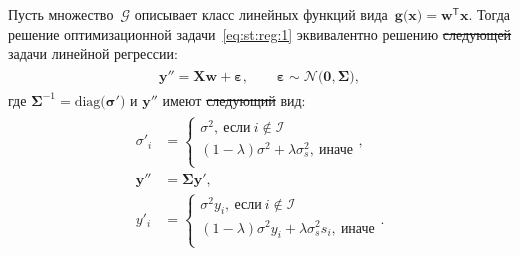 \documentclass[12pt]{a&t}
\providecommand{\DIFdel}[1]{{\protect\color{red}\sout{#1}}}                      %
\providecommand{\DIFaddbegin}{} %
\providecommand{\DIFaddend}{} %
\providecommand{\DIFdelbegin}{} %
\providecommand{\DIFdelend}{} %
\newcommand{\DIFscaledelfig}{0.5}
\newlength{\DIFdelgraphicswidth} %
\newlength{\DIFdelgraphicsheight} %
\newcommand{\DIFaddincludegraphics}[2][]{{\color{blue}\fbox{\DIFOincludegraphics[#1]{#2}}}} %
\newcommand{\DIFdelincludegraphics}[2][]{%
\sbox{\DIFdelgraphicsbox}{\DIFOincludegraphics[#1]{#2}}%
\settoboxwidth{\DIFdelgraphicswidth}{\DIFdelgraphicsbox} %
\settoboxtotalheight{\DIFdelgraphicsheight}{\DIFdelgraphicsbox} %
\scalebox{\DIFscaledelfig}{%
\parbox[b]{\DIFdelgraphicswidth}{\usebox{\DIFdelgraphicsbox}\\[-\baselineskip] \rule{\DIFdelgraphicswidth}{0em}}\llap{\resizebox{\DIFdelgraphicswidth}{\DIFdelgraphicsheight}{%
\setlength{\unitlength}{\DIFdelgraphicswidth}%
\begin{picture}(1,1)%
\thicklines\linethickness{2pt} %
{\color[rgb]{1,0,0}\put(0,0){\framebox(1,1){}}}%
{\color[rgb]{1,0,0}\put(0,0){\line( 1,1){1}}}%
{\color[rgb]{1,0,0}\put(0,1){\line(1,-1){1}}}%
\end{picture}%
}\hspace*{3pt}}} %
} %
\DeclareRobustCommand{\DIFaddbegin}{\DIFOaddbegin \let\includegraphics\DIFaddincludegraphics} %
\DeclareRobustCommand{\DIFaddend}{\DIFOaddend \let\includegraphics\DIFOincludegraphics} %
\DeclareRobustCommand{\DIFdelbegin}{\DIFOdelbegin \let\includegraphics\DIFdelincludegraphics} %
\DeclareRobustCommand{\DIFdelend}{\DIFOaddend \let\includegraphics\DIFOincludegraphics} %
\begin{document}
\begin{theorem}
\label{theorem:st:reg}
Пусть множество~$\mathcal{G}$ описывает класс линейных функций вида~$\mathbf{g}\bigr(\mathbf{x}\bigr) = \mathbf{w}^{\mathsf{T}}\mathbf{x}.$ Тогда решение оптимизационной задачи~\eqref{eq:st:reg:1} эквивалентно решению \DIFdelbegin \DIFdel{следующей }\DIFdelend задачи линейной регрессии:
\begin{gather}
\label{eq:st:reg:th:st:1}
\DIFdelbegin %
\DIFdelend \DIFaddbegin \begin{aligned}
\mathbf{y''} = \mathbf{X}\mathbf{w} + \bm{\varepsilon},\qquad \bm{\varepsilon} \sim \mathcal{N}\bigr(\mathbf{0}, \bm{\Sigma}\bigr),
\end{aligned}\DIFaddend 
\end{gather}
где $\bm{\Sigma}^{-1}=\text{diag}\bigr(\bm{\sigma'}\bigr)$ и $\mathbf{y''}$ имеют \DIFdelbegin \DIFdel{следующий }\DIFdelend вид:
\begin{gather}
\label{eq:st:reg:th:st:2}
\begin{aligned}
\sigma'_{i} &= \begin{cases}
\sigma^2,~\text{если}~i \not \in \mathcal{I}\\
\left(1-\lambda\right)\sigma^2+\lambda\sigma_s^2,~\text{иначе}\\
\end{cases}, \\
\mathbf{y''} &= \bm{\Sigma}\mathbf{y'},\\
y'_i &= \begin{cases}
\sigma^2y_i,~\text{если}~i \not \in \mathcal{I}\\
\left(1-\lambda\right)\sigma^2y_i+\lambda\sigma_s^2s_i,~\text{иначе}\\
\end{cases}.
\end{aligned}
\end{gather}
\end{theorem}
\end{document}
